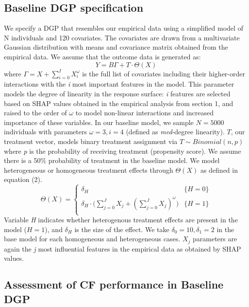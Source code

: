 \documentclass[12pt]{article}
\begin{document}
\subsection{Baseline DGP specification} 

We specify a DGP that resembles our empirical data using a simplified model of N individuals and 120 covariates. The covariates are drawn from a multivariate Gaussian distribution with means and covariance matrix obtained from the empirical data. We assume that the outcome data is generated as: 
\[ Y = B \Gamma + T  \cdot \Theta(X) \tag{1} \label{eq:special}\]
where $\Gamma = X + \sum_{i = 0}^{I} X_i^\omega$ is the full list of covariates including their higher-order interactions with the \textit{i} most important features in the model. This parameter models the degree of linearity in the response surface: \textit{i} features are selected based on SHAP values obtained in the empirical analysis from section 1, and raised to the order of $\omega$ to model non-linear interactions and increased importance of these variables. In our baseline model, we sample $N=5000$ individuals with parameters $\omega = 3, i = 4$ (defined as \textit{med}-degree linearity). $T$, our treatment vector, models binary treatment assignment via $ T \sim Binomial(n,p)$ where \textit{p} is the probability of receiving treatment (propensity score). We assume there is a 50\% probability of treatment in the baseline model. We model heterogeneous or homogeneous treatment effects through $\Theta(X)$ as defined in equation (2). 
\[
\Theta(X) =  \begin{cases} 
	 \delta_H & {\{H = 0\}} \\ 
	 \delta_H \cdot \big( \sum_{j = 0}^{J} X_j + (\sum_{j = 0}^{J} X_j )^\omega ) & \{ H = 1 \} \\ 
\end{cases} \tag{2} \label{eq:special} \]
Variable \textit{H} indicates whether heterogenous treatment effects are present in the model ($H = 1$), and $\delta_H$ is the size of the effect. We take $\delta_0 = 10, \delta_1 = 2$ in the base model for each homogeneous and heterogeneous cases. $X_j$ parameters are again the \textit{j} most influential features in the empirical data as obtained by SHAP values. \\

\subsection{Assessment of CF performance in Baseline DGP} 
\end{document}

